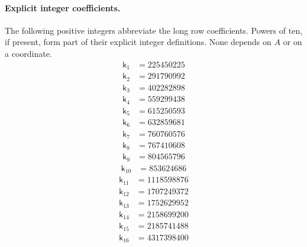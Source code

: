 \paragraph{Explicit integer coefficients.}
The following positive integers abbreviate the long row coefficients.
Powers of ten, if present, form part of their explicit integer definitions.
None depends on $A$ or on a coordinate.
\[
\begin{aligned}
\mathsf{k}_{1} &={} 225450225
\end{aligned}
\]
\[
\begin{aligned}
\mathsf{k}_{2} &={} 291790992
\end{aligned}
\]
\[
\begin{aligned}
\mathsf{k}_{3} &={} 402282898
\end{aligned}
\]
\[
\begin{aligned}
\mathsf{k}_{4} &={} 559299438
\end{aligned}
\]
\[
\begin{aligned}
\mathsf{k}_{5} &={} 615250593
\end{aligned}
\]
\[
\begin{aligned}
\mathsf{k}_{6} &={} 632859681
\end{aligned}
\]
\[
\begin{aligned}
\mathsf{k}_{7} &={} 760760576
\end{aligned}
\]
\[
\begin{aligned}
\mathsf{k}_{8} &={} 767410608
\end{aligned}
\]
\[
\begin{aligned}
\mathsf{k}_{9} &={} 804565796
\end{aligned}
\]
\[
\begin{aligned}
\mathsf{k}_{10} &={} 853624686
\end{aligned}
\]
\[
\begin{aligned}
\mathsf{k}_{11} &={} 1118598876
\end{aligned}
\]
\[
\begin{aligned}
\mathsf{k}_{12} &={} 1707249372
\end{aligned}
\]
\[
\begin{aligned}
\mathsf{k}_{13} &={} 1752629952
\end{aligned}
\]
\[
\begin{aligned}
\mathsf{k}_{14} &={} 2158699200
\end{aligned}
\]
\[
\begin{aligned}
\mathsf{k}_{15} &={} 2185741488
\end{aligned}
\]
\[
\begin{aligned}
\mathsf{k}_{16} &={} 4317398400
\end{aligned}
\]
